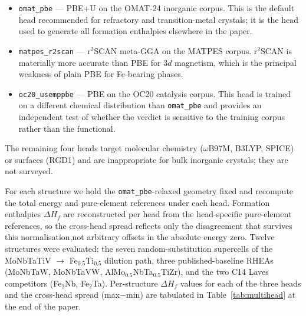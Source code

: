 \documentclass[11pt,a4paper]{article}
\begin{document}
\begin{itemize}[leftmargin=1.4em]
  \item \texttt{omat\_pbe} — PBE+U on the OMAT-24 inorganic corpus. This is the default head recommended for refractory and transition-metal crystals; it is the head used to generate all formation enthalpies elsewhere in the paper.
  \item \texttt{matpes\_r2scan} — r$^2$SCAN meta-GGA on the MATPES corpus. r$^2$SCAN is materially more accurate than PBE for $3d$ magnetism, which is the principal weakness of plain PBE for Fe-bearing phases.
  \item \texttt{oc20\_usemppbe} — PBE on the OC20 catalysis corpus. This head is trained on a different chemical distribution than \texttt{omat\_pbe} and provides an independent test of whether the verdict is sensitive to the training corpus rather than the functional.
\end{itemize}

The remaining four heads target molecular chemistry ($\omega$B97M, B3LYP, SPICE) or surfaces (RGD1) and are inappropriate for bulk inorganic crystals; they are not surveyed.

For each structure we hold the \texttt{omat\_pbe}-relaxed geometry fixed and recompute the total energy and pure-element references under each head. Formation enthalpies $\Delta H_f$ are reconstructed per head from the head-specific pure-element references, so the cross-head spread reflects only the disagreement that survives this normalisation,not arbitrary offsets in the absolute energy zero. Twelve structures were evaluated: the seven random-substitution supercells of the MoNbTaTiV $\rightarrow$ Fe$_{0.5}$Ti$_{0.5}$ dilution path, three published-baseline RHEAs (MoNbTaW, MoNbTaVW, AlMo$_{0.5}$NbTa$_{0.5}$TiZr), and the two C14 Laves competitors (Fe$_2$Nb, Fe$_2$Ta). Per-structure $\Delta H_f$ values for each of the three heads and the cross-head spread (max$-$min) are tabulated in Table~\ref{tab:multihead} at the end of the paper.
\end{document}
